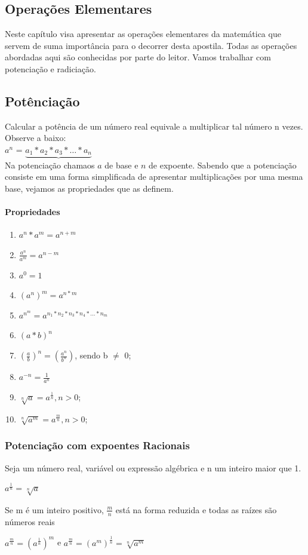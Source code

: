 \documentclass[a4paper,12pt,twoside,BCOR=10mm]{scrbook}
\begin{document}
\begin{titlepage}
\chapter{Operações Elementares}
Neste capítulo visa apresentar as operações elementares da matemática que servem de suma importância para o decorrer desta apostila. Todas as operações abordadas aqui são conhecidas por parte do leitor. Vamos trabalhar com potenciação e radiciação.

\section{Potênciação}
Calcular a potência de um número real equivale a multiplicar tal número n vezes. Observe  a baixo:
\\
\textbf{$a^{n}$}  = $\underbrace{a_{1} * a_{2} * a_{3} * … * a_{n}} $
\\
Na potenciação chamaos $a$ de base e $n$ de expoente. Sabendo que a potenciação consiste em uma forma simplificada de apresentar multiplicações por uma mesma base, vejamos as propriedades que as definem.

\subsubsection{Propriedades}
\begin{enumerate}
\item $a^{n} * a^{m} = a^{n + m}$
\item $\frac{a^{n}}{a^{m}} = a^{n - m}$
\item $a^{0} = 1$
\item $(a^{n})^{m} = a^{n * m}$
\item $a^{n^{m}} = a^{n_{1}*n_{2}*n_{3}*n_{4}*...*n_{m}}$
\item $(a * b)^{n}$
\item $(\frac{a}{b})^{n} = (\frac{a^{n}}{b^{n}})$, sendo b $\neq$ 0;
\item $a^{-n} = \frac{1}{a^{n}}$
\item $\sqrt[n]{a} = a^{\frac{1}{n}}, n > 0$;
\item $\sqrt[n]{a^{m}} = a^{\frac{m}{n}}, n > 0$;
\end{enumerate}

\subsection{Potenciação com expoentes Racionais}
Seja um número real, variável ou expressão algébrica e n um inteiro maior que 1. \\
\begin{center}
$a^\frac{1}{n} = \sqrt[n]{a}$
\end{center}
Se m é um inteiro positivo, $\frac{m}{n}$ está na forma reduzida e todas as raízes são números reais
\begin{center}
$a^\frac{m}{n} = (a^\frac{1}{n})^{m}$ e $a^\frac{m}{n} = (a^{m})^\frac{1}{n} = \sqrt[n]{a^{m}}$
\end{center}


\end{titlepage}
\end{document}
